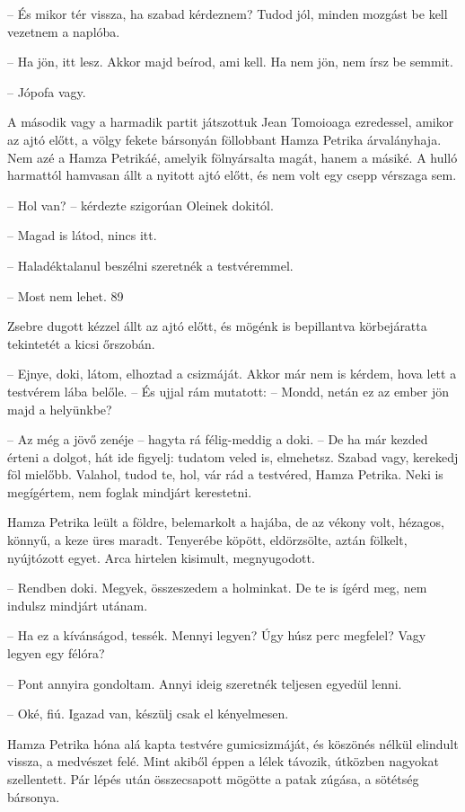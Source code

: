 \documentclass{IEEEtran}
\begin{document}
– És mikor tér vissza, ha szabad kérdeznem? Tudod jól, minden mozgást be kell
vezetnem a naplóba.

– Ha jön, itt lesz. Akkor majd beírod, ami kell. Ha nem jön, nem írsz be
semmit.

– Jópofa vagy.

A második vagy a harmadik partit játszottuk Jean Tomoioaga ezredessel, amikor
az ajtó előtt, a völgy fekete bársonyán föllobbant Hamza Petrika árvalányhaja.
Nem azé a Hamza Petrikáé, amelyik fölnyársalta magát, hanem a másiké. A hulló
harmattól hamvasan állt a nyitott ajtó előtt, és nem volt egy csepp vérszaga
sem.

– Hol van? – kérdezte szigorúan Oleinek dokitól.

– Magad is látod, nincs itt.

– Haladéktalanul beszélni szeretnék a testvéremmel.

– Most nem lehet.
89

Zsebre dugott kézzel állt az ajtó előtt, és mögénk is bepillantva körbejáratta
tekintetét a kicsi őrszobán.

– Ejnye, doki, látom, elhoztad a csizmáját. Akkor már nem is kérdem, hova lett
a testvérem lába belőle. – És ujjal rám mutatott: – Mondd, netán ez az ember
jön majd a helyünkbe?

– Az még a jövő zenéje – hagyta rá félig-meddig a doki. – De ha már kezded
érteni a dolgot, hát ide figyelj: tudatom veled is, elmehetsz. Szabad vagy,
kerekedj föl mielőbb. Valahol, tudod te, hol, vár rád a testvéred, Hamza
Petrika. Neki is megígértem, nem foglak mindjárt kerestetni.

Hamza Petrika leült a földre, belemarkolt a hajába, de az vékony volt,
hézagos, könnyű, a keze üres maradt. Tenyerébe köpött, eldörzsölte, aztán
fölkelt, nyújtózott egyet. Arca hirtelen kisimult, megnyugodott.

– Rendben doki. Megyek, összeszedem a holminkat. De te is ígérd meg, nem
indulsz mindjárt utánam.

– Ha ez a kívánságod, tessék. Mennyi legyen? Úgy húsz perc megfelel? Vagy
legyen egy félóra?

– Pont annyira gondoltam. Annyi ideig szeretnék teljesen egyedül lenni.

– Oké, fiú. Igazad van, készülj csak el kényelmesen.

Hamza Petrika hóna alá kapta testvére gumicsizmáját, és köszönés nélkül
elindult vissza, a medvészet felé. Mint akiből éppen a lélek távozik, útközben
nagyokat szellentett. Pár lépés után összecsapott mögötte a patak zúgása, a
sötétség bársonya.
\end{document}
